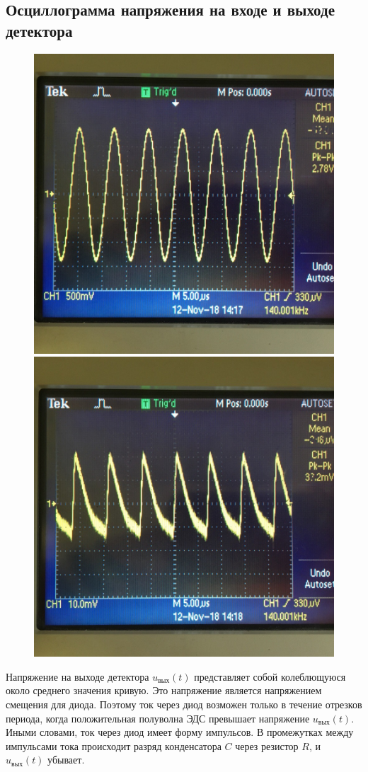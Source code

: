 \subsection{Осциллограмма напряжения на входе и выходе детектора}
\begin{figure}[h!]
	\begin{minipage}{0.49\linewidth}
		\centering
		\includegraphics[width=0.8\linewidth]{photo/311.jpg}
		\caption{}
		\label{photo:3.1.1}
	\end{minipage}
	\begin{minipage}{0.49\linewidth}
		\centering
		\includegraphics[width=0.8\linewidth]{photo/312.jpg}
		\caption{}
		\label{photo:3.1.2}
	\end{minipage}
\end{figure}
Напряжение на выходе детектора $u_\text{вых}(t)$ представляет собой колеблющуюся около среднего значения кривую. Это напряжение является напряжением смещения для диода. Поэтому ток через диод возможен только в течение отрезков периода, когда положительная полуволна ЭДС превышает напряжение $u_\text{вых}(t)$. Иными словами, ток через диод имеет форму импульсов. В промежутках между импульсами тока происходит разряд конденсатора $C$ через резистор $R$, и $u_\text{вых}(t)$ убывает.
